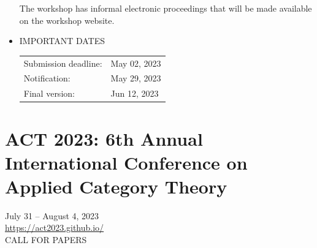 \documentclass[prodmode,acmtecs]{acmsmall} %
\begin{document}
\begin{itemize}
  The workshop has informal electronic proceedings that will be made available on the workshop website. 
 
\item  IMPORTANT DATES 
 
\begin{tabulary}{\linewidth}{LL}Submission deadline:  & May 02, 2023 \\
Notification:  & May 29, 2023 \\
Final version:  & Jun 12, 2023 \\
\end{tabulary}
 
\end{itemize}\section{ACT 2023: 6th Annual International Conference on Applied Category Theory}\label{ACT2023}  July 31 – August 4, 2023\\ 
  \href{https://act2023.github.io/}{https://act2023.github.io/}\\ 
CALL FOR PAPERS 
\end{document}

